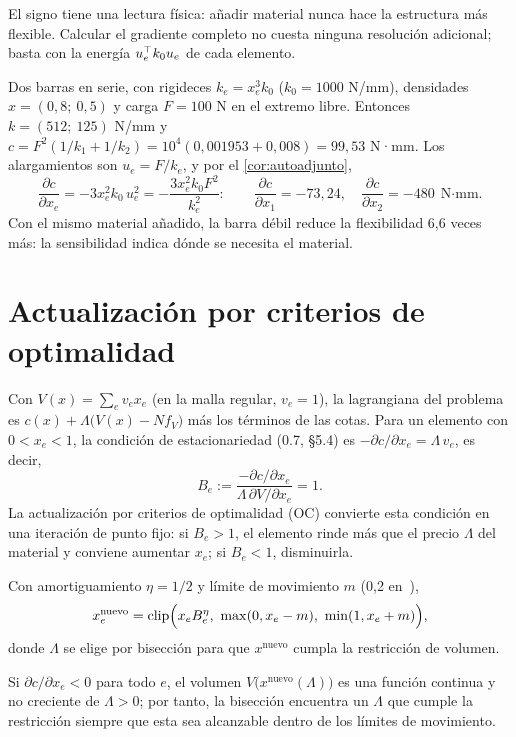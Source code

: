 El signo tiene una lectura física: añadir material nunca hace la estructura más flexible. Calcular el gradiente completo no cuesta ninguna resolución adicional; basta con la energía $u_e^\top k_0u_e$ de cada elemento.

\begin{ejemplo}\label{ej:serie}
Dos barras en serie, con rigideces $k_e=x_e^{3}k_0$ ($k_0=1000$ N/mm), densidades $x=(0{,}8;\ 0{,}5)$ y carga $F=100$ N en el extremo libre. Entonces $k=(512;\ 125)$ N/mm y $c=F^2(1/k_1+1/k_2)=10^4(0{,}001953+0{,}008)=99{,}53$ N·mm. Los alargamientos son $u_e=F/k_e$, y por el \cref{cor:autoadjunto},
\[
\frac{\partial c}{\partial x_e}=-3x_e^2k_0\,u_e^2=-\frac{3x_e^2k_0F^2}{k_e^2}:\qquad \frac{\partial c}{\partial x_1}=-73{,}24,\quad \frac{\partial c}{\partial x_2}=-480\ \ \text{N·mm}.
\]
Con el mismo material añadido, la barra débil reduce la flexibilidad 6,6 veces más: la sensibilidad indica dónde se necesita el material.
\end{ejemplo}

\section{Actualización por criterios de optimalidad}

Con $V(x)=\sum_ev_ex_e$ (en la malla regular, $v_e=1$), la lagrangiana del problema es $c(x)+\Lambda\bigl(V(x)-Nf_V\bigr)$ más los términos de las cotas. Para un elemento con $0<x_e<1$, la condición de estacionariedad (0.7, §5.4) es $-\partial c/\partial x_e=\Lambda\,v_e$, es decir,
\[
B_e:=\frac{-\partial c/\partial x_e}{\Lambda\,\partial V/\partial x_e}=1 .
\]
La actualización por criterios de optimalidad (OC) convierte esta condición en una iteración de punto fijo: si $B_e>1$, el elemento rinde más que el precio $\Lambda$ del material y conviene aumentar $x_e$; si $B_e<1$, disminuirla.

\begin{definicion}[Actualización OC]\label{def:oc}
Con amortiguamiento $\eta=1/2$ y límite de movimiento $m$ (0,2 en~\cite{andreassen}),
\[
x_e^{\text{nuevo}}=\clip\Bigl(x_eB_e^{\eta},\ \max(0,x_e-m),\ \min(1,x_e+m)\Bigr),
\]
donde $\Lambda$ se elige por bisección para que $x^{\text{nuevo}}$ cumpla la restricción de volumen.
\end{definicion}

\begin{proposicion}\label{prop:biseccion}
Si $\partial c/\partial x_e<0$ para todo $e$, el volumen $V\bigl(x^{\text{nuevo}}(\Lambda)\bigr)$ es una función continua y no creciente de $\Lambda>0$; por tanto, la bisección encuentra un $\Lambda$ que cumple la restricción siempre que esta sea alcanzable dentro de los límites de movimiento.
\end{proposicion}


